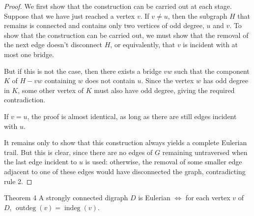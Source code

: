 \begin{proof}
We first show that the construction can be carried out at each stage. Suppose that we have just reached a vertex $v$. If $v \neq u$, then the subgraph $H$ that remains is connected and contains only two vertices of odd degree, $u$ and $v$. To show that the construction can be carried out, we must show that the removal of the next edge doesn't disconnect $H$, or equivalently, that $v$ is incident with at most one bridge.

But if this is not the case, then there exists a bridge $vw$ such that the component $K$ of $H - vw$ containing $w$ does not contain $u$. Since the vertex $w$ has odd degree in $K$, some other vertex of $K$ must also have odd degree, giving the required contradiction.

\begin{center}
\end{center}

If $v = u$, the proof is almost identical, as long as there are still edges incident with $u$.

It remains only to show that this construction always yields a complete Eulerian trail. But this is clear, since there are no edges of $G$ remaining untraversed when the last edge incident to $u$ is used: otherwise, the removal of some smaller edge adjacent to one of these edges would have disconnected the graph, contradicting rule 2.
\end{proof}

\begin{thmbox}{Theorem 4}
A strongly connected digraph $D$ is Eulerian $\iff$ for each vertex $v$ of $D$, $\operatorname{outdeg}(v) = \operatorname{indeg}(v)$.
\end{thmbox}

